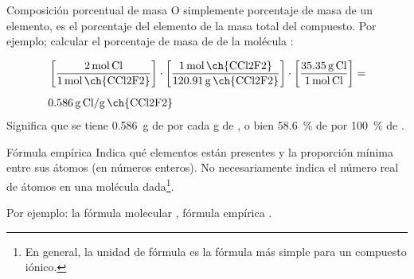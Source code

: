 \documentclass{beamer}
\begin{document}
  \begin{frame}{Composición porcentual de masa}
    O simplemente porcentaje de masa de un elemento, es el porcentaje del elemento de la masa total del compuesto. Por ejemplo; calcular el porcentaje de masa de  de la molécula :\par
    \begin{align*}
      &\left[\frac{\qty{2}{\mole\,Cl}}{\qty{1}{\mole\,\ch{CCl2F2}}}\right]\cdot\left[\frac{\qty{1}{\mole\,\ch{CCl2F2}}}{\qty{120.91}{\gram\,\ch{CCl2F2}}}\right]\cdot\left[\frac{\qty{35.35}{\gram\,Cl}}{\qty{1}{\mole\,Cl}}\right]=\\[5pt]
      &\qty{0.586}{\gram\,Cl\per\gram\,\ch{CCl2F2}}
    \end{align*}
    Significa que se tiene \qty{0.586}{\gram} de  por cada \unit{\gram} de , o bien \qty{58.6}{\percent} de  por \qty{100}{\percent} de . 
  \end{frame}
  \begin{frame}{Fórmula empírica}
    Indica qué elementos están presentes y la proporción mínima entre sus átomos (en números enteros). No necesariamente indica el número real de átomos en una molécula dada\footnote{En general, la unidad de fórmula es la fórmula más simple para un compuesto iónico.}.\par
    Por ejemplo: la fórmula molecular , fórmula empírica .
  \end{frame}
\end{document}
